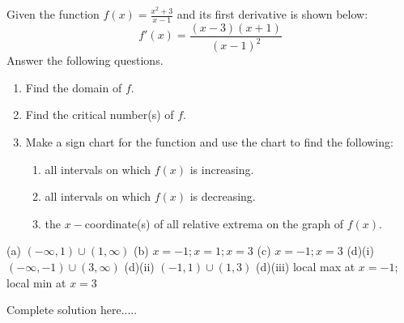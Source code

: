 \begin{example}
Given the function $f(x)=\displaystyle\frac{x^2+3}{x-1}$ and its first derivative is shown below:
\begin{equation*}
    f'(x)=\frac{(x-3)(x+1)}{(x-1)^2}
\end{equation*}
Answer the following questions.
\renewcommand{\labelenumi}{(\alph{enumi})}
\begin{enumerate}[leftmargin=*]
    \item Find the domain of $f$.
    \item Find the critical number(s) of $f$. 
    \newpage
    \item Make a sign chart for the function and use the chart to find the following:
    \renewcommand{\labelenumii}{(\roman{enumii})}
    \begin{enumerate}
        \item all intervals on which $f(x)$ is increasing.
        \item all intervals on which $f(x)$ is decreasing.
        \item the $x-$coordinate(s) of all relative extrema on the graph of $f(x)$. 
    \end{enumerate}
\end{enumerate}
    \begin{sol}
    (a) $(-\infty,1)\cup (1,\infty)$ (b) $x=-1;x=1;x=3$ (c) $x=-1;x=3$ (d)(i) $(-\infty,-1)\cup (3,\infty)$ (d)(ii) $(-1,1)\cup (1,3)$ (d)(iii) local max at $x=-1$; local min at $x=3$
    \end{sol}
    \begin{solL}
    Complete solution here.....
    
    \end{solL}
    
\end{example}

